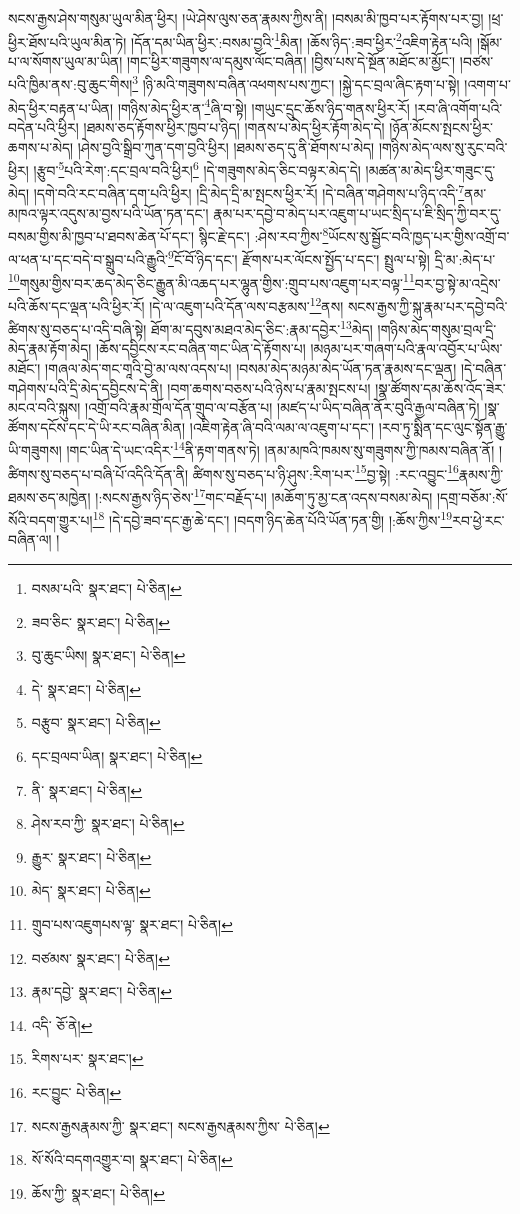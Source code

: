 སངས་རྒྱས་ཤེས་གསུམ་ཡུལ་མིན་ཕྱིར། །ཡེ་ཤེས་ལུས་ཅན་རྣམས་ཀྱིས་ནི། །བསམ་མི་ཁྱབ་པར་རྟོགས་པར་བྱ། །ཕྲ་ཕྱིར་ཐོས་པའི་ཡུལ་མིན་ཏེ། །དོན་དམ་ཡིན་ཕྱིར་:བསམ་བྱའི་\footnote{བསམ་པའི་  སྣར་ཐང་།  པེ་ཅིན། }མིན། །ཆོས་ཉིད་:ཟབ་ཕྱིར་\footnote{ཟབ་ཅིང་  སྣར་ཐང་།  པེ་ཅིན། }འཇིག་རྟེན་པའི། །སྒོམ་པ་ལ་སོགས་ཡུལ་མ་ཡིན། །གང་ཕྱིར་གཟུགས་ལ་དམུས་ལོང་བཞིན། །བྱིས་པས་དེ་སྔོན་མཐོང་མ་མྱོང་། །བཙས་པའི་ཁྱིམ་ནས་:བུ་ཆུང་གིས།\footnote{བུ་ཆུང་ཡིས།  སྣར་ཐང་།  པེ་ཅིན། } །ཉི་མའི་གཟུགས་བཞིན་འཕགས་པས་ཀྱང་། །སྐྱེ་དང་བྲལ་ཞིང་རྟག་པ་སྟེ། །འགག་པ་མེད་ཕྱིར་བརྟན་པ་ཡིན། །གཉིས་མེད་ཕྱིར་ན་\footnote{དེ་  སྣར་ཐང་།  པེ་ཅིན། }ཞི་བ་སྟེ། །གཡུང་དྲུང་ཆོས་ཉིད་གནས་ཕྱིར་རོ། །རབ་ཞི་འགོག་པའི་བདེན་པའི་ཕྱིར། །ཐམས་ཅད་རྟོགས་ཕྱིར་ཁྱབ་པ་ཉིད། །གནས་པ་མེད་ཕྱིར་རྟོག་མེད་དེ། །ཉོན་མོངས་སྤངས་ཕྱིར་ཆགས་པ་མེད། །ཤེས་བྱའི་སྒྲིབ་ཀུན་དག་བྱའི་ཕྱིར། །ཐམས་ཅད་དུ་ནི་ཐོགས་པ་མེད། །གཉིས་མེད་ལས་སུ་རུང་བའི་ཕྱིར། །རྩུབ་\footnote{བརྩུབ་  སྣར་ཐང་།  པེ་ཅིན། }པའི་རེག་:དང་བྲལ་བའི་ཕྱིར།\footnote{དང་བྲལབ་ཡིན།  སྣར་ཐང་།  པེ་ཅིན། } །དེ་གཟུགས་མེད་ཅིང་བལྟར་མེད་དེ། །མཚན་མ་མེད་ཕྱིར་གཟུང་དུ་མེད། །དགེ་བའི་རང་བཞིན་དག་པའི་ཕྱིར། །དྲི་མེད་དྲི་མ་སྤངས་ཕྱིར་རོ། །དེ་བཞིན་གཤེགས་པ་ཉིད་འདི་\footnote{ནི་  སྣར་ཐང་།  པེ་ཅིན། }ནམ་མཁའ་ལྟར་འདུས་མ་བྱས་པའི་ཡོན་ཏན་དང་། རྣམ་པར་དབྱེ་བ་མེད་པར་འཇུག་པ་ཡང་སྲིད་པ་ཇི་སྲིད་ཀྱི་བར་དུ་བསམ་གྱིས་མི་ཁྱབ་པ་ཐབས་ཆེན་པོ་དང་། སྙིང་རྗེ་དང་། :ཤེས་རབ་ཀྱིས་\footnote{ཤེས་རབ་ཀྱི་  སྣར་ཐང་།  པེ་ཅིན། }ཡོངས་སུ་སྦྱོང་བའི་ཁྱད་པར་གྱིས་འགྲོ་བ་ལ་ཕན་པ་དང་བདེ་བ་སྒྲུབ་པའི་རྒྱུའི་\footnote{རྒྱུར་  སྣར་ཐང་།  པེ་ཅིན། }ངོ་བོ་ཉིད་དང་། རྫོགས་པར་ལོངས་སྤྱོད་པ་དང་། སྤྲུལ་པ་སྟེ། དྲི་མ་:མེད་པ་\footnote{མེད་  སྣར་ཐང་།  པེ་ཅིན། }གསུམ་གྱིས་བར་ཆད་མེད་ཅིང་རྒྱུན་མི་འཆད་པར་ལྷུན་གྱིས་:གྲུབ་པས་འཇུག་པར་བལྟ་\footnote{གྲུབ་པས་འཇུགཔས་ལྟ་  སྣར་ཐང་།  པེ་ཅིན། }བར་བྱ་སྟེ་མ་འདྲེས་པའི་ཆོས་དང་ལྡན་པའི་ཕྱིར་རོ། །དེ་ལ་འཇུག་པའི་དོན་ལས་བརྩམས་\footnote{བཙམས་  སྣར་ཐང་།  པེ་ཅིན། }ནས། སངས་རྒྱས་ཀྱི་སྐུ་རྣམ་པར་དབྱེ་བའི་ཚིགས་སུ་བཅད་པ་འདི་བཞི་སྟེ། ཐོག་མ་དབུས་མཐའ་མེད་ཅིང་:རྣམ་དབྱེར་\footnote{རྣམ་དབྱེ་  སྣར་ཐང་།  པེ་ཅིན། }མེད། །གཉིས་མེད་གསུམ་བྲལ་དྲི་མེད་རྣམ་རྟོག་མེད། །ཆོས་དབྱིངས་རང་བཞིན་གང་ཡིན་དེ་རྟོགས་པ། །མཉམ་པར་གཞག་པའི་རྣལ་འབྱོར་པ་ཡིས་མཐོང་། །གཞལ་མེད་གང་གཱའི་བྱེ་མ་ལས་འདས་པ། །བསམ་མེད་མཉམ་མེད་ཡོན་ཏན་རྣམས་དང་ལྡན། །དེ་བཞིན་གཤེགས་པའི་དྲི་མེད་དབྱིངས་དེ་ནི། །བག་ཆགས་བཅས་པའི་ཉེས་པ་རྣམ་སྤངས་པ། །སྣ་ཚོགས་དམ་ཆོས་འོད་ཟེར་མངའ་བའི་སྐུས། །འགྲོ་བའི་རྣམ་གྲོལ་དོན་གྲུབ་ལ་བརྩོན་པ། །མཛད་པ་ཡིད་བཞིན་ནོར་བུའི་རྒྱལ་བཞིན་ཏེ། །སྣ་ཚོགས་དངོས་དང་དེ་ཡི་རང་བཞིན་མིན། །འཇིག་རྟེན་ཞི་བའི་ལམ་ལ་འཇུག་པ་དང་། །རབ་ཏུ་སྨིན་དང་ལུང་སྟོན་རྒྱུ་ཡི་གཟུགས། །གང་ཡིན་དེ་ཡང་འདིར་\footnote{འདི་  ཅོ་ནེ། }ནི་རྟག་གནས་ཏེ། །ནམ་མཁའི་ཁམས་སུ་གཟུགས་ཀྱི་ཁམས་བཞིན་ནོ། །ཚིགས་སུ་བཅད་པ་བཞི་པོ་འདིའི་དོན་ནི། ཚིགས་སུ་བཅད་པ་ཉི་ཤུས་:རིག་པར་\footnote{རིགས་པར་  སྣར་ཐང་། }བྱ་སྟེ། :རང་འབྱུང་\footnote{རང་བྱུང་  པེ་ཅིན། }རྣམས་ཀྱི་ཐམས་ཅད་མཁྱེན། །:སངས་རྒྱས་ཉིད་ཅེས་\footnote{སངས་རྒྱསརྣམས་ཀྱི་  སྣར་ཐང་། སངས་རྒྱསརྣམས་ཀྱིས་  པེ་ཅིན། }གང་བརྗོད་པ། །མཆོག་ཏུ་མྱ་ངན་འདས་བསམ་མེད། །དགྲ་བཅོམ་:སོ་སོའི་བདག་གྱུར་པ།\footnote{སོ་སོའི་བདགའགྱུར་བ།  སྣར་ཐང་།  པེ་ཅིན། } །དེ་དབྱེ་ཟབ་དང་རྒྱ་ཆེ་དང་། །བདག་ཉིད་ཆེན་པོའི་ཡོན་ཏན་གྱི། །:ཆོས་ཀྱིས་\footnote{ཆོས་ཀྱི་  སྣར་ཐང་།  པེ་ཅིན། }རབ་ཕྱེ་རང་བཞིན་ལ། །
